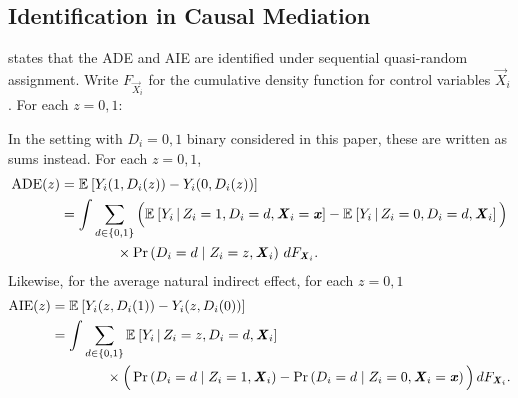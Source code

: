 
%
%


\subsection{Identification in Causal Mediation}
\label{appendix:identification}
\citet[Theorem~1]{imai2010identification} states that the ADE and AIE are identified under sequential quasi-random assignment.
Write $F_{\vec X_i}$ for the cumulative density function for control variables $\vec X_i$.
For each $z = 0,1$: \\

In the  setting with $D_i =0,1$ binary considered in this paper, these are written as sums instead.
For each $z=0,1$,
\begin{align*}
    \operatorname{ADE}(z)
    &= \mathbb{E}_{} \left[ Y_i(1,D_i(z))-Y_i(0,D_i(z)) \right] \\
    &= \int \sum_{d \in \{0,1\}} \Big(
        \mathbb{E}_{} \left[ Y_i \, \middle\vert \, Z_i=1,D_i=d,\boldsymbol{\mathit{X}}_i=\boldsymbol{\mathit{x}} \right] - \mathbb{E}_{} \left[ Y_i \, \middle\vert \, Z_i=0,D_i=d,\boldsymbol{\mathit{X}}_i \right] \Big) \\
    &\qquad\qquad\times \Pr\left( D_i=d\mid Z_i=z,\boldsymbol{\mathit{X}}_i \right) \,dF_{\boldsymbol{\mathit{X}}_i}.
\end{align*}
Likewise, for the average natural indirect effect, for each $z=0,1$
\begin{align*}
    \operatorname{AIE}(z)
    &= \mathbb{E}_{} \left[ Y_i(z,D_i(1))-Y_i(z,D_i(0)) \right] \\
    &= \int \sum_{d \in \{0,1\}} \mathbb{E}_{} \left[ Y_i \, \middle\vert \, Z_i=z,D_i=d,\boldsymbol{\mathit{X}}_i \right] \\
    &\qquad\qquad
    \times \Big(\Pr\left( D_i=d\mid Z_i=1,\boldsymbol{\mathit{X}}_i \right) - \Pr\left( D_i=d\mid Z_i=0,\boldsymbol{\mathit{X}}_i=\boldsymbol{\mathit{x}} \right) \Big) \,dF_{\boldsymbol{\mathit{X}}_i}.
\end{align*}

